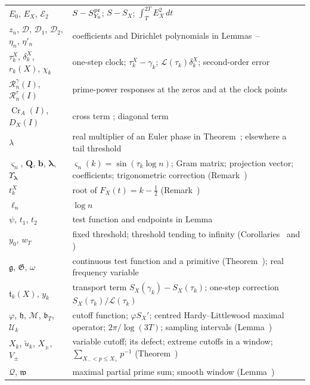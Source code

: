 \documentclass[preprint,12pt]{elsarticle}
\makeatletter
\let\CG@origref\ref
\let\CG@origeqref\eqref
\newcommand{\CG@gettip}[1]{\@ifundefined{CGTip@#1}{Reference: #1}{\csname CGTip@#1\endcsname}}
\DeclareRobustCommand{\CGref}[1]{\pdftooltip{\CG@origref{#1}}{\CG@gettip{#1}}}
\DeclareRobustCommand{\CGeqref}[1]{\pdftooltip{\CG@origeqref{#1}}{\CG@gettip{#1}}}
\numberwithin{equation}{section}
\theoremstyle{plain}
\theoremstyle{definition}
\theoremstyle{remark}
\newcommand{\lL}{\mathcal L}
\newcommand{\Cr}{\operatorname{Cr}}
\newcommand{\Rg}{\mathcal R^{\gamma}}
\newcommand{\Rt}{\mathcal R^{\tau}}
\makeatother
\begin{document}
\begin{center}
\begin{longtable}{p{}p{}}
$E_0$, $E_X$, $\mathcal E_2$ & $S-S^{\rm pr}_{Y_0}$; $S-S_X$; $\int_T^{2T}E_X^2\,dt$\\
$z_n$, $\mathcal D$, $\mathcal D_1$, $\mathcal D_2$, $\eta_n$, $\eta'_n$ & coefficients and Dirichlet polynomials in Lemmas~\CGref{lem:trig_MV}--\CGref{lem:D_moments}\\
$\tau_k^X$, $\delta_k^X$, $r_k(X)$, $\chi_k$ & one-step clock; $\tau_k^X-\gamma_k$; $\lL(\tau_k)\delta_k^X$; second-order error \CGeqref{eq:one_step_decomposition}\\
$\Rg_n(I)$, $\Rt_n(I)$ & prime-power responses at the zeros and at the clock points \CGeqref{eq:two_responses}\\
$\Cr_A(I)$, $D_X(I)$ & cross term \CGeqref{eq:Cr_def}; diagonal term \CGeqref{eq:full_factor_gain}\\
$\lambda$ & real multiplier of an Euler phase in Theorem~\CGref{thm:accounting}; elsewhere a tail threshold\\
$\varsigma_n$, $\mathbf Q$, $\mathbf b$, $\boldsymbol\lambda$, $\Upsilon_{\boldsymbol\lambda}$ & $\varsigma_n(k)=\sin(\tau_k\log n)$; Gram matrix; projection vector; coefficients; trigonometric correction (Remark~\CGref{rem:matrix_projection})\\
$t_k^X$ & root of $F_X(t)=k-\frac12$ (Remark~\CGref{rem:localization})\\
$\ell_n$ & $\log n$\\
$\psi$, $t_1$, $t_2$ & test function and endpoints in Lemma~\CGref{lem:first_moment_identity}\\
$y_0$, $w_T$ & fixed threshold; threshold tending to infinity (Corollaries~\CGref{cor:fixed_cutoff} and \CGref{cor:power_cutoff})\\
$\mathfrak g$, $\mathfrak G$, $\omega$ & continuous test function and a primitive (Theorem~\CGref{thm:identity_g}); real frequency variable\\
$\mathfrak t_k(X)$, $y_k$ & transport term $S_X(\gamma_k)-S_X(\tau_k)$; one-step correction $S_X(\tau_k)/\lL(\tau_k)$\\
$\varphi$, $\mathfrak h$, $\mathcal M$, $\mathfrak b_T$, $\mathcal U_k$ & cutoff function; $\varphi S_X'$; centred Hardy--Littlewood maximal operator; $2\pi/\log(3T)$; sampling intervals (Lemma~\CGref{lem:transport})\\
$X_k$, $\tilde u_k$, $X_\pm$, $V_\pm$ & variable cutoff; its defect; extreme cutoffs in a window; $\sum_{X_-<p\le X_+}p^{-1}$ (Theorem~\CGref{thm:variable_cutoff})\\
$\mathcal Q$, $\mathfrak w$ & maximal partial prime sum; smooth window (Lemma~\CGref{lem:maximal_primes})\\

\end{longtable}
\end{center}
\end{document}
